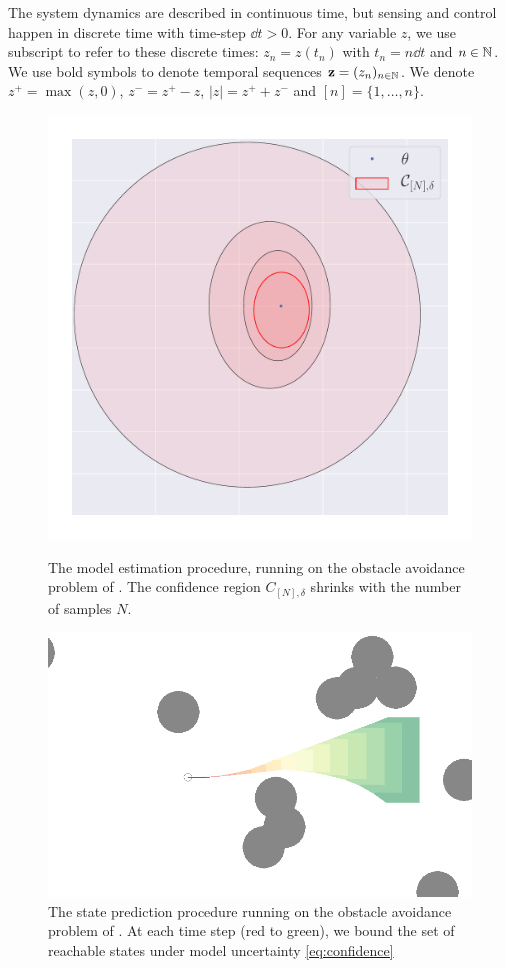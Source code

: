 \documentclass{article}
\begin{document}
The system dynamics are described in continuous time, but sensing and control happen in discrete time with time-step $\dd t>0$. For any variable $z$, we use subscript to refer to these discrete times: $z_n = z(t_n)$ with $t_n = n\dd t$ and $n\in\mathbb{N}$. We use bold symbols to denote temporal sequences $\mathbf{z} = (z_n)_{n\in\mathbb{N}}$. We denote $z^+ = \max(z,0)$, $z^- = z^+-z$, $|z| = z^++z^-$ and $[n]=\{1,\dots, n\}$.

\begin{figure}
	\begin{minipage}[b]{0.49\linewidth}
		\centering
		\includegraphics[trim={4cm 0 0 0}, clip, width=0.5\linewidth]{img/ellipsoid}
		\caption{The model estimation procedure, running on the obstacle avoidance problem of . The confidence region $C_{[N],\delta}$ shrinks with the number of samples $N$.}
		\label{fig:estimation}
	\end{minipage}
	\hfill
	\begin{minipage}[b]{0.49\linewidth}
		\centering
		\includegraphics[trim={4cm 0 0 0}, clip, width=0.8\linewidth]{img/obstacle_small}
		\caption{The state prediction procedure running on the obstacle avoidance problem of . At each time step (red to green), we bound the set of reachable states under model uncertainty \eqref{eq:confidence}}
		\label{fig:prediction}
	\end{minipage}%
\end{figure}
\end{document}
